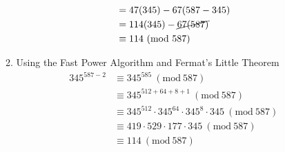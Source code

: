 \documentclass{article}
\newcommand{\Mod}[1]{\ (\mathrm{mod}\ #1)}
\begin{document}
\begin{enumerate}[label=\alph*)]
\begin{enumerate}[label=(\roman*)]
\begin{align*}
                          & = 47(345) - 67(587-345)       \\
                          & = 114(345) - \cancel{67(587)} \\
                          & \equiv 114 \Mod{587}
                    \end{align*}
              \item Using the Fast Power Algorithm and Fermat's Little Theorem
                    \begin{align*}
                        345^{587-2} & \equiv 345^{585} \Mod{587}                                        \\
                                    & \equiv 345^{512+64+8+1} \Mod{587}                                 \\
                                    & \equiv 345^{512} \cdot 345^{64} \cdot 345^{8} \cdot 345 \Mod{587} \\
                                    & \equiv 419 \cdot 529 \cdot 177 \cdot 345 \Mod{587}                \\
                                    & \equiv 114 \Mod{587}
                    \end{align*}
          \end{enumerate}
\end{enumerate}
\end{document}
